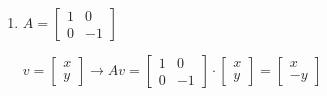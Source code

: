 \begin{enumerate}[label=\color{lightblue}\arabic*)]
	\item $A=\begin{bmatrix}
		1 & 0\\
		0 & -1
	\end{bmatrix}$
	\begin{center}
		$v=\begin{bmatrix}
			x\\
			y
		\end{bmatrix}\longrightarrow Av=\begin{bmatrix}
			1 & 0\\
			0 & -1
		\end{bmatrix}\cdot\begin{bmatrix}
			x\\
			y
		\end{bmatrix}=\begin{bmatrix}
			x\\
			-y
		\end{bmatrix}$
		
		\vspace{1cm}
		

\end{center}
\end{enumerate}
